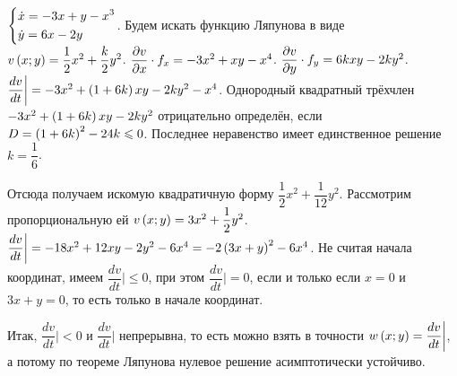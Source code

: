 \documentclass[a5paper,10pt]{article}
\begin{document}
$\left\{ \begin{aligned}& \dot{x} = -3x + y - x^3 \\& \dot{y} = 6x - 2y\end{aligned} \right.$. Будем искать функцию Ляпунова в виде $v\left(x; y\right) = \dfrac {1} {2} x^2 + \dfrac {k} {2} y^2 $. 
$\dfrac{\partial v}{\partial x} \cdot f_{x} = -3x^{2} + xy - x^{4}$.
$\dfrac{\partial v}{\partial y} \cdot f_{y} = 6kxy - 2ky^2$.
$\dfrac{dv}{dt}\bigg| = -3x^2 + \left(1 + 6k\right) xy - 2ky^2 - x^4$.
Однородный квадратный трёхчлен $-3x^2 + \left(1 + 6k\right) xy - 2ky^2$ отрицательно определён, если $D = \left(1 + 6k\right)^2 - 24k \leqslant 0$. Последнее неравенство имеет единственное решение $k = \dfrac {1} {6}$.

Отсюда получаем искомую квадратичную форму $\dfrac {1} {2} x^2 + \dfrac {1} {12} y^2 $. Рассмотрим пропорциональную ей $v\left(x; y\right) = 3x^2 + \dfrac {1} {2}y^2$. $\dfrac{dv}{dt}\bigg| = -18 x^2 + 12 xy - 2y^2 - 6x^4 = -2 \left(3x + y\right)^2 - 6x^4$. Не считая начала координат, имеем $\dfrac{dv}{dt}\bigg| \le 0$, при этом $\dfrac{dv}{dt}\bigg| = 0$, если и только если $x = 0$ и $3x + y = 0$, то есть только в начале координат.

Итак, $\dfrac{dv}{dt}\bigg| < 0$ и $\dfrac{dv}{dt}\bigg|$ непрерывна, то есть можно взять в точности $w\left(x; y\right) = \dfrac{dv}{dt}\bigg|$, а потому по теореме Ляпунова нулевое решение асимптотически устойчиво.
\end{document}
